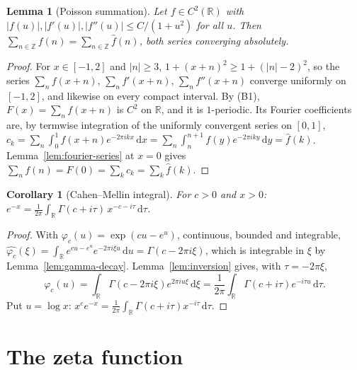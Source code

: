 \documentclass[11pt]{article}
\newtheorem{lemma}[theorem]{Lemma}
\newtheorem{corollary}[theorem]{Corollary}
\theoremstyle{definition}
\newcommand{\R}{\mathbb{R}}
\newcommand{\Z}{\mathbb{Z}}
\newcommand{\dd}{\,\mathrm{d}}
\begin{document}
\begin{lemma}[Poisson summation]\label{lem:poisson}
Let $f\in C^{2}(\R)$ with $|f(u)|,|f'(u)|,|f''(u)|\le C/(1+u^{2})$ for all $u$. Then $\sum_{n\in\Z}f(n)=\sum_{n\in\Z}\widehat f(n)$, both series converging absolutely.
\end{lemma}
\begin{proof}
For $x\in[-1,2]$ and $|n|\ge3$, $1+(x+n)^{2}\ge1+(|n|-2)^{2}$, so the series $\sum_nf(x+n)$, $\sum_nf'(x+n)$, $\sum_nf''(x+n)$ converge uniformly on $[-1,2]$, and likewise on every compact interval. By (B1), $F(x)=\sum_nf(x+n)$ is $C^{2}$ on $\R$, and it is $1$-periodic.
Its Fourier coefficients are, by termwise integration of the uniformly convergent series on $[0,1]$,
$c_k=\sum_n\int_0^1f(x+n)e^{-2\pi ikx}\dd x=\sum_n\int_n^{n+1}f(y)e^{-2\pi iky}\dd y=\widehat f(k)$.
Lemma~\ref{lem:fourier-series} at $x=0$ gives $\sum_nf(n)=F(0)=\sum_kc_k=\sum_k\widehat f(k)$.
\end{proof}

\begin{corollary}[Cahen--Mellin integral]\label{lem:cahen-mellin}
For $c>0$ and $x>0$:
$\displaystyle e^{-x}=\frac{1}{2\pi}\int_\R\Gamma(c+i\tau)\,x^{-c-i\tau}\dd\tau$.
\end{corollary}
\begin{proof}
With $\varphi_c(u)=\exp(cu-e^{u})$, continuous, bounded and integrable,
$\widehat{\varphi_c}(\xi)=\int_\R e^{cu-e^{u}}e^{-2\pi i\xi u}\dd u=\Gamma(c-2\pi i\xi)$, which is integrable in $\xi$ by Lemma~\ref{lem:gamma-decay}.
Lemma~\ref{lem:inversion} gives, with $\tau=-2\pi\xi$,
\[
\varphi_c(u)=\int_\R\Gamma(c-2\pi i\xi)e^{2\pi iu\xi}\dd\xi=\frac1{2\pi}\int_\R\Gamma(c+i\tau)e^{-i\tau u}\dd\tau .
\]
Put $u=\log x$: $x^{c}e^{-x}=\frac1{2\pi}\int_\R\Gamma(c+i\tau)x^{-i\tau}\dd\tau$.
\end{proof}

\section{The zeta function}\label{sec:zeta}
\end{document}
